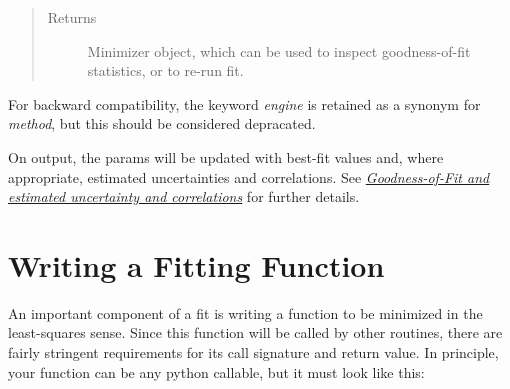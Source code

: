 \documentclass[letterpaper,10pt,english]{sphinxmanual}
\begin{document}
\begin{fulllineitems}
\begin{quote}
\begin{description}
\begin{itemize}
\end{itemize}

\item[{Returns}] \leavevmode
Minimizer object, which can be used to inspect goodness-of-fit
statistics, or to re-run fit.

\end{description}\end{quote}

For backward compatibility, the keyword \emph{engine} is retained as a synonym for \emph{method},
but this should be considered depracated.

On output, the params will be updated with best-fit values and, where
appropriate, estimated uncertainties and correlations.  See
{\hyperref[fitting:fit-results-label]{\emph{Goodness-of-Fit and estimated uncertainty and correlations}}} for further details.

\end{fulllineitems}



\section{Writing a Fitting Function}
\label{fitting:fit-func-label}\label{fitting:writing-a-fitting-function}
An important component of a fit is writing a function to be minimized in
the least-squares sense.   Since this function will be called by other
routines, there are fairly stringent requirements for its call signature
and return value.   In principle, your function can be any python callable,
but it must look like this:
\end{document}
